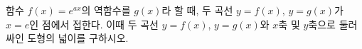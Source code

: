 \hspace*{2mm}\begin{minipage}[t]{\dimexpr\linewidth-2mm\relax}\vspace{0pt}
함수 $f(x)=e^{ax}$의 역함수를 $g(x)$라 할 때, 두 곡선 $y=f(x)$, $y=g(x)$가 $x=e$인 점에서 접한다. 이때 두 곡선 $y=f(x)$, $y=g(x)$와 $x$축 및 $y$축으로 둘러싸인 도형의 넓이를 구하시오. \end{minipage}
